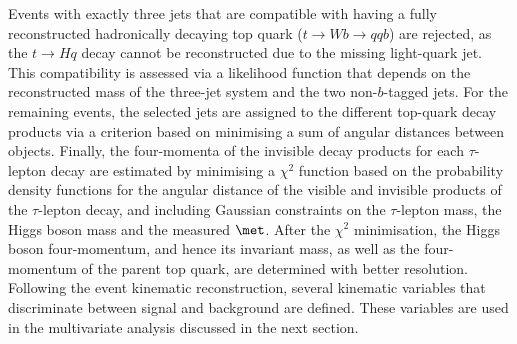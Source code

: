 Events with exactly three jets that are compatible with having a fully reconstructed hadronically decaying 
top quark ($t \to Wb \to qqb$) are rejected, as the $t \to Hq$ decay cannot be reconstructed due to the missing light-quark jet.
This compatibility is assessed via a likelihood function that depends on the reconstructed mass of the three-jet 
system and the two non-$b$-tagged jets.
For the remaining events, the selected jets are assigned to the different top-quark decay products via a criterion based on 
minimising a sum of angular distances between objects. Finally, the four-momenta of the invisible decay products for each $\tau$-lepton decay 
are estimated by minimising a $\chi^2$ function based on the probability density functions for the angular distance of the visible and invisible
products of the $\tau$-lepton decay, and including Gaussian constraints on the $\tau$-lepton mass, the Higgs boson mass and the
measured $\met$. After the $\chi^2$ minimisation, the Higgs boson four-momentum, and hence its invariant mass, as well as the 
four-momentum of the parent top quark, are determined with better resolution. Following the event kinematic reconstruction, several kinematic variables
that discriminate between signal and background are defined. These variables are used in the multivariate analysis discussed in the next section.

